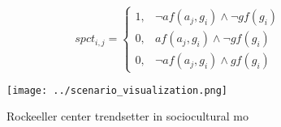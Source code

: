 \documentclass[a4paper]{article}
\begin{document}
\begin{equation}
spct_{i,j} =
\begin{cases}
1, & \text{$\neg af(a_j,g_i) \wedge \neg gf(g_i)$}\\
0, & \text{$af(a_j,g_i) \wedge \neg gf(g_i)$}\\
0, & \text{$\neg af(a_j,g_i) \wedge gf(g_i)$}
\end{cases}
\end{equation}

\begin{figure}
\centering
\texttt{[image: ../scenario\_visualization.png]}
\caption{Rockeeller center trendsetter in sociocultural mo
}
\end{figure}
 
\end{document}
